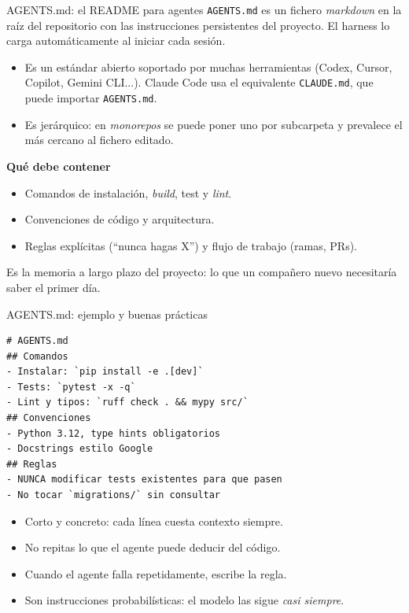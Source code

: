 \begin{frame}{AGENTS.md: el README para agentes}
\alert{\texttt{AGENTS.md}} \cite{agentsmd} es un fichero \textit{markdown} en la raíz del repositorio con las \alert{instrucciones persistentes} del proyecto. El harness lo \alert{carga automáticamente} al iniciar cada sesión.
 
\begin{itemize}
    \item Es un \alert{estándar abierto} soportado por muchas herramientas (Codex, Cursor, Copilot, Gemini CLI...). Claude Code usa el equivalente \texttt{CLAUDE.md}, que puede importar \texttt{AGENTS.md}.
    \item Es \alert{jerárquico}: en \textit{monorepos} se puede poner uno por subcarpeta y prevalece el más cercano al fichero editado.
\end{itemize}
 
\textbf{Qué debe contener}
\begin{itemize}
    \item \alert{Comandos} de instalación, \textit{build}, test y \textit{lint}.
    \item \alert{Convenciones} de código y arquitectura.
    \item \alert{Reglas explícitas} (``nunca hagas X'') y flujo de trabajo (ramas, PRs).
\end{itemize}
 
Es la \alert{memoria a largo plazo} del proyecto: lo que un compañero nuevo necesitaría saber el primer día.
\end{frame}
 
\begin{frame}[fragile]{AGENTS.md: ejemplo y buenas prácticas}
\begin{block}{}
\scriptsize
\begin{verbatim}
# AGENTS.md
## Comandos
- Instalar: `pip install -e .[dev]`
- Tests: `pytest -x -q`
- Lint y tipos: `ruff check . && mypy src/`
## Convenciones
- Python 3.12, type hints obligatorios
- Docstrings estilo Google
## Reglas
- NUNCA modificar tests existentes para que pasen
- No tocar `migrations/` sin consultar
\end{verbatim}
\end{block}
 
\begin{itemize}
    \item \alert{Corto y concreto:} cada línea \alert{cuesta contexto} siempre.
    \item No repitas lo que el agente puede \alert{deducir del código}.
    \item Cuando el agente falla \alert{repetidamente}, escribe la regla.
    \item Son instrucciones \alert{probabilísticas}: el modelo las sigue \textit{casi siempre}.
\end{itemize}
\end{frame}
 
